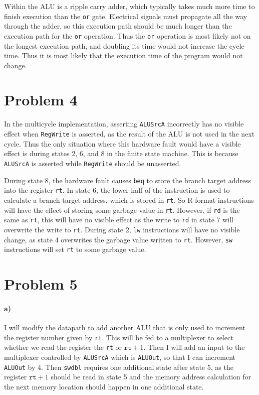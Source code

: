 \documentclass[12pt]{article}
\begin{document}
Within the ALU is a ripple carry adder, which typically takes much more time to finish execution than the \texttt{or} gate. Electrical signals must propagate all
the way through the adder, so this execution path should be much longer than the execution path for the \texttt{or} operation. Thus the \texttt{or} operation
is most likely not on the longest execution path, and doubling its time would not increase the cycle time. Thus it is most likely that the execution time of the
program would not change.

\section*{Problem 4}

In the multicycle implementation, asserting \texttt{ALUSrcA} incorrectly has no visible effect when \texttt{RegWrite} is asserted, as the result of the ALU
is not used in the next cycle. Thus the only situation where this hardware fault would have a visible effect is during states 2, 6, and 8 in the finite state
machine. This is because \texttt{ALUSrcA} is asserted while \texttt{RegWrite} should be unasserted.

During state 8, the hardware fault causes \texttt{beq} to store the branch target address into the register \texttt{rt}. In state 6, the lower half of the instruction
is used to calculate a branch target address, which is stored in \texttt{rt}. So R-format instructions will have the effect of storing some
garbage value in \texttt{rt}. However, if \texttt{rd} is the same as \texttt{rt}, this will have no visible effect as the write to \texttt{rd} in state 7
will overwrite the write to \texttt{rt}. During state 2, \texttt{lw} instructions will have no visible change, as state 4 overwrites the garbage value written to \texttt{rt}.
However, \texttt{sw} instructions will set \texttt{rt} to some garbage value.

\section*{Problem 5}

\paragraph{a)}

I will modify the datapath to add another ALU that is only used to increment the register number given by \texttt{rt}. This will be fed to a multiplexer to select
whether we read the register the \texttt{rt} or \(\texttt{rt}+1\). Then I will add an input to the multiplexer controlled by \texttt{ALUSrcA} which is \texttt{ALUOut},
so that I can increment \texttt{ALUOut} by 4. Then \texttt{swdbl} requires one additional state after state 5, as the register \(\texttt{rt}+1\) should be read in state
5 and the memory address calculation for the next memory location should happen in one additional state.
\end{document}
